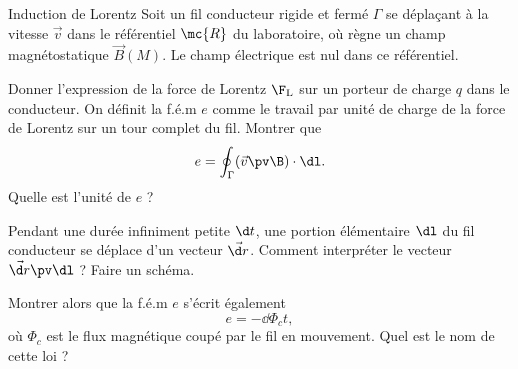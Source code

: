 \begin{exo}[PC][1][colle]{Induction de Lorentz}
  Soit un fil conducteur rigide et fermé $\Gamma$ se déplaçant à la vitesse $\Vec{v}$ dans le référentiel $\mc{R}$ du laboratoire, où règne un champ magnétostatique $\Vec{B}(M)$. Le champ électrique est nul dans ce référentiel.
  \begin{quest}
    \item	Donner l'expression de la force de Lorentz $\F_{\rm L}$ sur un porteur de charge $q$ dans le conducteur. On définit la f.é.m $e$ comme le travail par unité de charge de la force de Lorentz sur un tour complet du fil. Montrer que 
    $$
    e = \oint_\Gamma (\Vec{v} \pv \B) \cdot \dl.
    $$
    Quelle est l'unité de $e$ ?
    \item Pendant une durée infiniment petite $\d t$, une portion élémentaire $\dl$ du fil conducteur se déplace d'un vecteur $\Vec{\d r}$. Comment interpréter le vecteur $\Vec{\d r} \pv \dl$ ? Faire un schéma.
    \item Montrer alors que la f.é.m $e$ s'écrit également
    $$
    e = -\dd{\Phi_c}{t},
    $$
    où $\Phi_c$ est le flux magnétique coupé par le fil en mouvement. Quel est le nom de cette loi ?
  \end{quest} 

\end{exo}


